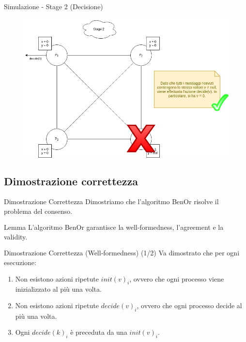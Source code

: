 \documentclass{beamer}
\begin{document}
\begin{frame}{Simulazione - Stage 2 (Decisione)}
\begin{figure}
    \centering
    \includegraphics[scale=0.35]{simulazione/simulazione12.png}
\end{figure}
\end{frame}

\subsection{Dimostrazione correttezza}
\begin{frame}{Dimostrazione Correttezza}
    Dimostriamo che l'algoritmo BenOr risolve il problema del consenso.
    
    \begin{block}{Lemma}
        L'algoritmo BenOr garantisce la well-formedness, l'agreement e la validity.
    \end{block}
\end{frame}

\begin{frame}{Dimostrazione Correttezza (Well-formedness) (1/2)} %
    Va dimostrato che per ogni esecuzione:
    \begin{enumerate}
        \item Non esistono azioni ripetute $init(v)_{i}$, ovvero che ogni processo viene inizializzato al più una volta.
        \item Non esistono azioni ripetute $decide(v)_{i}$, ovvero che ogni processo decide al più una volta.
        \item Ogni $decide(k)_{i}$ è preceduta da una $init(v)_{i}$.
    \end{enumerate}
\end{frame}
\end{document}
